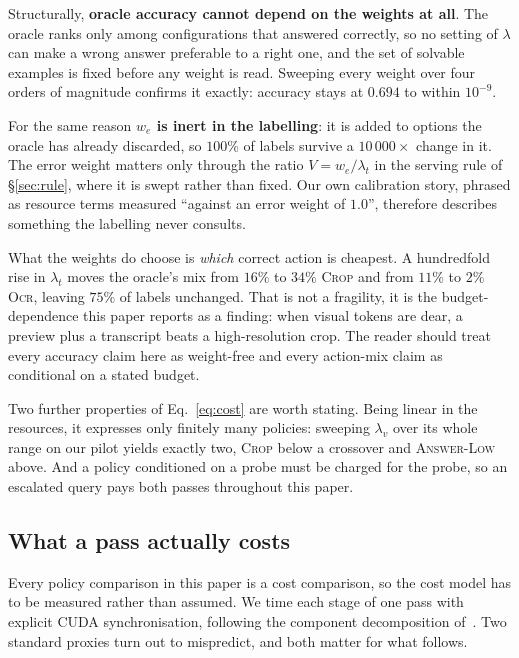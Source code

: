 \documentclass[10pt,twocolumn]{article}
\theoremstyle{plain}
\newcommand{\answerlow}{\textsc{Answer-Low}}
\newcommand{\crop}{\textsc{Crop}}
\newcommand{\ocr}{\textsc{Ocr}}
\begin{document}
Structurally, \textbf{oracle accuracy cannot depend on the weights at all}. The
oracle ranks only among configurations that answered correctly, so no setting of
$\lambda$ can make a wrong answer preferable to a right one, and the set of
solvable examples is fixed before any weight is read. Sweeping every weight over
four orders of magnitude confirms it exactly: accuracy stays at $0.694$ to
within $10^{-9}$.

For the same reason \textbf{$w_e$ is inert in the labelling}: it is added to
options the oracle has already discarded, so $100\%$ of labels survive a
$10\,000\times$ change in it. The error weight matters only through the ratio
$V = w_e/\lambda_t$ in the serving rule of \S\ref{sec:rule}, where it is swept
rather than fixed. Our own calibration story, phrased as resource terms measured
``against an error weight of $1.0$'', therefore describes something the labelling
never consults.

What the weights do choose is \emph{which} correct action is cheapest. A
hundredfold rise in $\lambda_t$ moves the oracle's mix from $16\%$ to $34\%$
\crop{} and from $11\%$ to $2\%$ \ocr{}, leaving $75\%$ of labels unchanged.
That is not a fragility, it is the budget-dependence this paper reports as a
finding: when visual tokens are dear, a preview plus a transcript beats a
high-resolution crop. The reader should treat every accuracy claim here as
weight-free and every action-mix claim as conditional on a stated budget.

Two further properties of Eq.~\ref{eq:cost} are worth stating. Being linear in the
resources, it expresses only finitely many policies: sweeping $\lambda_v$ over
its whole range on our pilot yields exactly two, \crop{} below a crossover and
\answerlow{} above. And a policy conditioned on a probe must be charged for the
probe, so an escalated query pays both passes throughout this paper.

\subsection{What a pass actually costs}
\label{sec:cost}

Every policy comparison in this paper is a cost comparison, so the cost model
has to be measured rather than assumed. We time each stage of one pass with
explicit CUDA synchronisation, following the component decomposition
of~\cite{quantization}. Two standard proxies turn out to mispredict, and both
matter for what follows.
\end{document}
